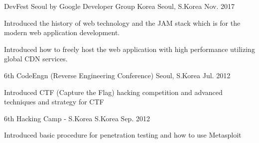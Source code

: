 

\begin{cventries}

	{DevFest Seoul by Google Developer Group Korea} %
	{Seoul, S.Korea} %
	{Nov. 2017} %
	{
		\begin{cvitems} %
			\item {Introduced the history of web technology and the JAM stack which is for the modern web application development.}
			\item {Introduced how to freely host the web application with high performance utilizing global CDN services.}
		\end{cvitems}
	}

	{6th CodeEngn (Reverse Engineering Conference)} %
	{Seoul, S.Korea} %
	{Jul. 2012} %
	{
		\begin{cvitems} %
			\item {Introduced CTF (Capture the Flag) hacking competition and advanced techniques and strategy for CTF}
		\end{cvitems}
	}

	{6th Hacking Camp - S.Korea} %
	{S.Korea} %
	{Sep. 2012} %
	{
		\begin{cvitems} %
			\item {Introduced basic procedure for penetration testing and how to use Metasploit}
		\end{cvitems}
	}

\end{cventries}
